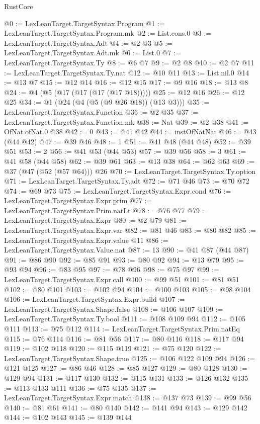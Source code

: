 \begin{lexlean}{RustCore}
\begin{coremodule}
@0 := LexLeanTarget.TargetSyntax.Program
@1 := LexLeanTarget.TargetSyntax.Program.mk
@2 := List.cons.{0}
@3 := LexLeanTarget.TargetSyntax.Adt
@4 := @2 @3
@5 := LexLeanTarget.TargetSyntax.Adt.mk
@6 := List.{0}
@7 := LexLeanTarget.TargetSyntax.Ty
@8 := @6 @7
@9 := @2 @8
@10 := @2 @7
@11 := LexLeanTarget.TargetSyntax.Ty.nat
@12 := @10 @11
@13 := List.nil.{0}
@14 := @13 @7
@15 := @12 @14
@16 := @12 @15
@17 := @9 @16
@18 := @13 @8
@24 := @4 (@5 (@17 (@17 (@17 (@17 @18)))))
@25 := @12 @16
@26 := @12 @25
@34 := @1 (@24 (@4 (@5 (@9 @26 @18)) (@13 @3)))
@35 := LexLeanTarget.TargetSyntax.Function
@36 := @2 @35
@37 := LexLeanTarget.TargetSyntax.Function.mk
@38 := Nat
@39 := @2 @38
@41 := OfNat.ofNat.{0} @38
@42 := 0
@43 := @41 @42
@44 := instOfNatNat
@46 := @43 (@44 @42)
@47 := @39 @46
@48 := 1
@51 := @41 @48 (@44 @48)
@52 := @39 @51
@53 := 2
@56 := @41 @53 (@44 @53)
@57 := @39 @56
@58 := 3
@61 := @41 @58 (@44 @58)
@62 := @39 @61
@63 := @13 @38
@64 := @62 @63
@69 := @37 (@47 (@52 (@57 @64))) @26
@70 := LexLeanTarget.TargetSyntax.Ty.option
@71 := LexLeanTarget.TargetSyntax.Ty.adt
@72 := @71 @46
@73 := @70 @72
@74 := @69 @73
@75 := LexLeanTarget.TargetSyntax.Expr.cond
@76 := LexLeanTarget.TargetSyntax.Expr.prim
@77 := LexLeanTarget.TargetSyntax.Prim.natLt
@78 := @76 @77
@79 := LexLeanTarget.TargetSyntax.Expr
@80 := @2 @79
@81 := LexLeanTarget.TargetSyntax.Expr.var
@82 := @81 @46
@83 := @80 @82
@85 := LexLeanTarget.TargetSyntax.Expr.value @11
@86 := LexLeanTarget.TargetSyntax.Value.nat
@87 := 13
@90 := @41 @87 (@44 @87)
@91 := @86 @90
@92 := @85 @91
@93 := @80 @92
@94 := @13 @79
@95 := @93 @94
@96 := @83 @95
@97 := @78 @96
@98 := @75 @97
@99 := LexLeanTarget.TargetSyntax.Expr.call
@100 := @99 @51
@101 := @81 @51
@102 := @80 @101
@103 := @102 @94
@104 := @100 @103
@105 := @98 @104
@106 := LexLeanTarget.TargetSyntax.Expr.build
@107 := LexLeanTarget.TargetSyntax.Shape.false
@108 := @106 @107
@109 := LexLeanTarget.TargetSyntax.Ty.bool
@111 := @108 @109 @94
@112 := @105 @111
@113 := @75 @112
@114 := LexLeanTarget.TargetSyntax.Prim.natEq
@115 := @76 @114
@116 := @81 @56
@117 := @80 @116
@118 := @117 @94
@119 := @102 @118
@120 := @115 @119
@121 := @75 @120
@122 := LexLeanTarget.TargetSyntax.Shape.true
@125 := @106 @122 @109 @94
@126 := @121 @125
@127 := @86 @46
@128 := @85 @127
@129 := @80 @128
@130 := @129 @94
@131 := @117 @130
@132 := @115 @131
@133 := @126 @132
@135 := @113 @133 @111
@136 := @75 @135
@137 := LexLeanTarget.TargetSyntax.Expr.match
@138 := @137 @73
@139 := @99 @56
@140 := @81 @61
@141 := @80 @140
@142 := @141 @94
@143 := @129 @142
@144 := @102 @143
@145 := @139 @144

\end{coremodule}
\end{lexlean}
